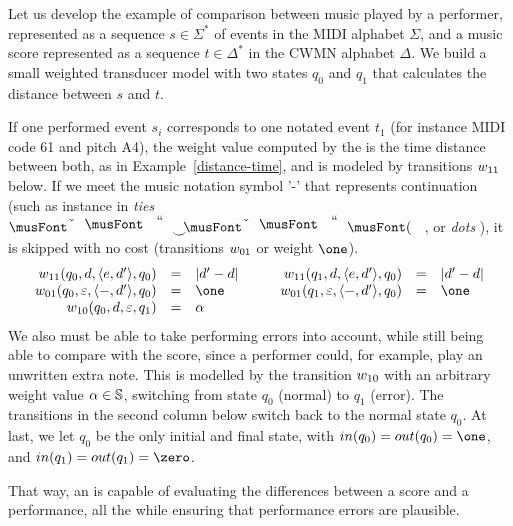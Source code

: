 \begin{example}\label{ex:SWT}
Let us develop the example of comparison between music played by a performer,
represented as a sequence $s \in \Sigma^*$ of events in the MIDI alphabet $\Sigma$,
and  a music score represented as a sequence $t \in \Delta^*$
in the CWMN alphabet $\Delta$. We build a small weighted transducer model
 with two states $q_0$ and $q_1$ that
calculates the distance between $s$ and $t$.

If one performed event $s_i$  corresponds
to one notated event $t_1$ (for instance MIDI code 61 and pitch A4),
the weight value computed by the \SWT is the time distance between both,
as in Example~\ref{distance-time}, and is modeled by
transitions $\wei_{11}$ below.
%
If we meet the music notation symbol '-' that
represents continuation (such as instance in \emph{ties}
$\musQuarter\!\!\!\mathrel{\raisebox{-1.5mm}{$\smile$}}\!\!\!\musEighth$,
or \emph{dots} \musQuarterDotted{}), it is  skipped with no cost (transitions $\wei_{01}$ or weight $\one$).
\[
\begin{array}{rclcrcl}
\wei_{11}(q_0, d, \< \mathsf{e}, d'>, q_0) & = & |d' - d| & \quad &
\wei_{11}(q_1, d, \< \mathsf{e}, d'>, q_0) & = & |d' - d|\\
\wei_{01}(q_0, \varepsilon, \< \mathsf{-}, d'>, q_0) & = & \one & &
\wei_{01}(q_1, \varepsilon, \< \mathsf{-}, d'>, q_0) & = & \one\\
\wei_{10}(q_0, d, \varepsilon, q_1) & = & \alpha & & %
\end{array}
\]
%
We also must be able to take performing errors into account, while still being able to compare with the score,
since a performer could, for example, play an unwritten extra note.
%
This is modelled by the transition $\wei_{10}$ with an arbitrary weight value $\alpha \in \mathbb{S}$,
switching from state $q_0$ (normal) to $q_1$ (error).
The transitions in the second column below switch back to the normal state $q_0$.
At last, we let $q_0$ be the only initial and final state, with
$\init(q_0) = \final(q_0) = \one$, and
$\init(q_1) = \final(q_1) = \zero$.

That way, an \SWT is capable of evaluating the differences between a score and a performance,
all the while ensuring that performance errors are plausible.
\endex
\end{example}


